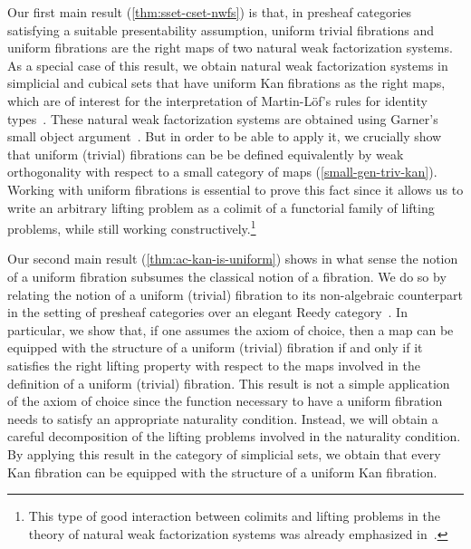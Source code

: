 \documentclass[reqno,10pt,a4paper,oneside,draft]{amsart}
\begin{document}
Our first main result (\cref{thm:sset-cset-nwfs}) is that, in presheaf categories satisfying a suitable presentability assumption,  uniform trivial fibrations and uniform fibrations are the right maps of two natural weak factorization systems.
As a special case of this result, we obtain natural weak factorization systems in simplicial and cubical sets that have uniform Kan fibrations as the right maps, which are of interest for the interpretation of Martin-L\"of's rules for identity types~\cite{awodey-warren:homotopy-idtype,gambino-garner:idtypewfs,warren:thesis,garner:topological-simplicial,shulman:inverse-diagrams}.
These natural weak factorization systems are obtained using Garner's small object argument~\cite{garner:small-object-argument}.
But in order to be able to apply it, we crucially show that uniform (trivial) fibrations can be be defined equivalently by weak orthogonality with respect to a small category of maps (\cref{small-gen-triv-kan}).
Working with uniform fibrations is essential to prove this fact since it allows us to write an arbitrary lifting problem as a colimit of a functorial family of lifting problems, while still working constructively.\footnote{This type of good interaction between colimits and lifting problems in the theory of natural weak factorization systems was already emphasized in~\cite{riehl-cat-homotopy}.}


Our second main result (\cref{thm:ac-kan-is-uniform}) shows in what sense the notion of a uniform fibration subsumes the classical notion of a fibration.
We do so by relating the notion of a uniform (trivial) fibration to its non-algebraic counterpart in the setting of presheaf categories over an elegant Reedy category~\cite{bergner-rezk-elegant}.
In particular, we show that, if one assumes the axiom of choice, then a map can be equipped with the structure of a uniform (trivial) fibration if and only if it satisfies the right lifting property with respect to the maps involved in the definition of a uniform (trivial) fibration.
This result is not a simple application of the axiom of choice since the function necessary to have a uniform fibration needs to satisfy an appropriate naturality condition.
Instead, we will obtain a careful decomposition of the lifting problems involved in the naturality condition.
By applying this result in the category of simplicial sets, we obtain that every Kan fibration can be equipped with the structure of a uniform Kan fibration.
\end{document}
